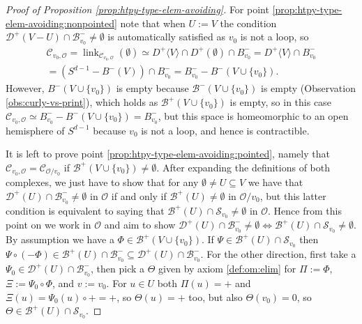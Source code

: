 \documentclass[a4paper,11pt,reqno, english]{amsart}
\theoremstyle{definition}
\theoremstyle{remark}
\DeclareMathOperator{\link}{\mathrm{link}}
\begin{document}
\begin{proof}[Proof of Proposition \ref{prop:htpy-type-elem-avoiding}]
    For point \ref{prop:htpy-type-elem-avoiding:nonpointed} note that when $U:=V$ the condition $\mathscr{D}^+(V-U)\cap\mathscr{B}^-_{v_0}\neq\emptyset$ is automatically satisfied as $v_0$ is not a loop, so 
    \begin{multline*}
    \mathscr{C}_{v_0,\mathscr{O}}=\link_{\mathscr{C}_{v_0,\mathscr{O}}}(\emptyset)\simeq D^+\langle V\rangle\cap D^+(\emptyset)\cap B^-_{v_0}=D^+\langle V\rangle\cap B^-_{v_0}\\ =(S^{d-1}-B^-(V))\cap B^-_{v_0}=B^-_{v_0}-B^-(V\cup\{v_0\}).	
    \end{multline*}
    However, $B^-(V\cup\{v_0\})$ is empty because $\mathscr{B}^-(V\cup\{v_0\})$ is empty (Observation \ref{obs:curly-vs-print}), which holds as $\mathscr{B}^+(V\cup\{v_0\})$ is empty, so in this case $\mathscr{C}_{v_0,\mathscr{O}}\simeq B^-_{v_0}-B^-(V\cup\{v_0\})=B^-_{v_0}$, but this space is homeomorphic to an open hemisphere of $S^{d-1}$ because $v_0$ is not a loop, and hence is contractible.

    It is left to prove point \ref{prop:htpy-type-elem-avoiding:pointed}, namely that $\mathscr{C}_{v_0,\mathscr{O}}=\mathscr{C}_{\mathscr{O}/v_0}$ if $\mathscr{B}^+(V\cup\{v_0\})\neq\emptyset$.
    After expanding the definitions of both complexes, we just have to show that for any $\emptyset\neq U\subseteq V$ we have that $\mathscr{D}^+(U)\cap\mathscr{B}^-_{v_0}\neq\emptyset$ in $\mathscr{O}$ if and only if $\mathscr{B}^+(U)\neq\emptyset$ in $\mathscr{O}/v_0$, but this latter condition is equivalent to saying that $\mathscr{B}^+(U)\cap\mathscr{S}_{v_0}\neq\emptyset$ in $\mathscr{O}$. Hence from this point on we work in $\mathscr{O}$ and aim to show $\mathscr{D}^+(U)\cap\mathscr{B}^-_{v_0}\neq\emptyset\iff\mathscr{B}^+(U)\cap\mathscr{S}_{v_0}\neq\emptyset$.
    By assumption we have a $\Phi\in\mathscr{B}^+(V\cup\{v_0\})$. If $\Psi\in\mathscr{B}^+(U)\cap\mathscr{S}_{v_0}$ then $\Psi\circ(-\Phi)\in\mathscr{B}^+(U)\cap\mathscr{B}^-_{v_0}\subseteq\mathscr{D}^+(U)\cap\mathscr{B}^-_{v_0}$. For the other direction, first take a $\Psi_0\in\mathscr{D}^+(U)\cap\mathscr{B}^-_{v_0}$, then pick a $\Theta$ given by axiom \ref{def:om:elim} for $\Pi:=\Phi$, $\Xi:=\Psi_0\circ\Phi$, and $v:=v_0$. For $u\in U$ both $\Pi(u)=+$ and $\Xi(u)=\Psi_0(u)\circ+=+$, so $\Theta(u)=+$ too, but also $\Theta(v_0)=0$, so $\Theta\in\mathscr{B}^+(U)\cap\mathscr{S}_{v_0}$.
\end{proof}
\end{document}
